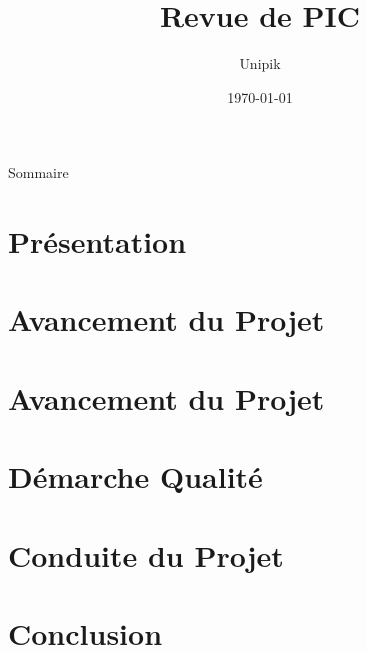 \documentclass[compress,xcolor=dvipsnames]{beamer}
\title{Revue de PIC}
\date{\today}
\author{Unipik}
\institute{\insa}
\begin{document}
\speaker{\Melissa} 

\begin{frame}[plain]
	\titlepage
\end{frame}

\begin{frame}{Sommaire}
	\tableofcontents[hideallsubsections]
\end{frame}
 

\speaker{\Sergi}
\section[Présentation]{Présentation}



\section[Le projet]{Avancement du Projet}



\section[Avancement]{Avancement du Projet}



\section[Qualité]{Démarche Qualité}


\section[Conduite du projet]{Conduite du Projet}



\section[Conclusion]{Conclusion}

\end{document}
